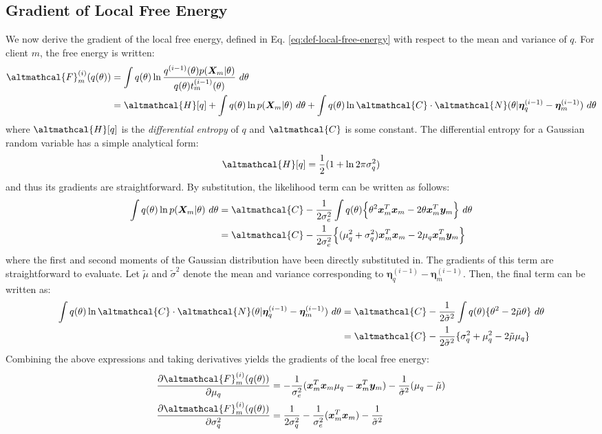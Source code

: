 \subsection{Gradient of Local Free Energy}
We now derive the gradient of the local free energy, defined in Eq. \eqref{eq:def-local-free-energy} with respect to the mean and variance of $q$. For client $m$, the free energy is written:
\begin{align}
\altmathcal{F}_{m}^{(i)}(q(\theta)) &= \int q(\theta) \ln \frac{q^{(i-1)}(\theta) p(\bm{X}_{m}|\theta)}{q(\theta) t_{m}^{(i-1)}(\theta)}\ d\theta \nonumber \\
&= \altmathcal{H}[q] + \int q(\theta) \ln p(\bm{X}_m|\theta)\ d\theta + \int q(\theta) \ln \altmathcal{C} \cdot \altmathcal{N}(\theta| \bm{\eta}_q^{(i-1)} - \bm{\eta}_m^{(i-1)})\ d\theta
\end{align}
where $\altmathcal{H}[q]$ is the \emph{differential entropy} of $q$ and $\altmathcal{C}$ is some constant. The differential entropy for a Gaussian random variable has a simple analytical form:
\begin{align}
\altmathcal{H}[q] = \frac{1}{2} (1 + \ln 2\pi \sigma_q^2)
\end{align}
\citep{Bishop:2006} and thus its gradients are straightforward. By substitution, the likelihood term can be written as follows:
\begin{align}
\int q(\theta) \ln p(\bm{X}_m|\theta)\ d\theta &= \altmathcal{C} - \frac{1}{2\sigma_e^2} \int q(\theta) \Big \lbrace \theta^2 \bm{x}_m^T \bm{x}_m - 2\theta \bm{x}_m^T \bm{y}_m \Big \rbrace\ d\theta \nonumber \\ 
&= \altmathcal{C} - \frac{1}{2\sigma_e^2} \Big \lbrace (\mu_q^2 + \sigma_q^2) \bm{x}_m^T \bm{x}_m - 2\mu_q \bm{x}_m^T \bm{y}_m \Big \rbrace\ 
\end{align}
where the first and second moments of the Gaussian distribution have been directly substituted in. The gradients of this term are straightforward to evaluate. Let $\tilde{\mu}$ and $\tilde{\sigma}^2$ denote the mean and variance corresponding to $\bm{\eta}_q^{(i-1)} - \bm{\eta}_m^{(i-1)}$. Then, the final term can be written as:
\begin{align}
\int q(\theta) \ln \altmathcal{C} \cdot \altmathcal{N}(\theta| \bm{\eta}_q^{(i-1)} - \bm{\eta}_m^{(i-1)})\ d\theta &= \altmathcal{C} - \frac{1}{2\tilde{\sigma}^2} \int q(\theta) \lbrace \theta^2 - 2\tilde{\mu}\theta \rbrace\ d\theta \nonumber \\
&= \altmathcal{C} - \frac{1}{2\tilde{\sigma}^2} \lbrace \sigma_q^2 + \mu_q^2 - 2\tilde{\mu} \mu_q \rbrace
\end{align}
Combining the above expressions and taking derivatives yields the gradients of the local free energy:
\begin{align}
\frac{\partial \altmathcal{F}_{m}^{(i)}(q(\theta))}{\partial \mu_q} &= -\frac{1}{\sigma_e^2} (\bm{x}_m^T \bm{x}_m \mu_q - \bm{x}_m^T \bm{y}_m) - \frac{1}{\tilde{\sigma}^2} (\mu_q - \tilde{\mu}) \\ 
\frac{\partial \altmathcal{F}_{m}^{(i)}(q(\theta))}{\partial \sigma_q^2} &= \frac{1}{2\sigma_q^2} -\frac{1}{\sigma_e^2} (\bm{x}_m^T \bm{x}_m) - \frac{1}{\tilde{\sigma}^2}
\end{align}

